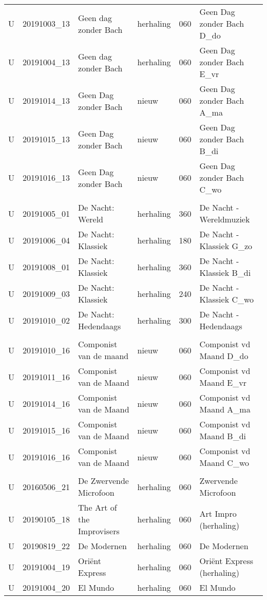 \documentclass[]{article}
\begin{document}
\begin{longtable}[l]{llllll}
U & 20191003\_13 & Geen dag zonder Bach & herhaling & 060 & Geen Dag zonder Bach D\_do\\
U & 20191004\_13 & Geen dag zonder Bach & herhaling & 060 & Geen Dag zonder Bach E\_vr\\
U & 20191014\_13 & Geen Dag zonder Bach & nieuw & 060 & Geen Dag zonder Bach A\_ma\\
U & 20191015\_13 & Geen Dag zonder Bach & nieuw & 060 & Geen Dag zonder Bach B\_di\\
\addlinespace
U & 20191016\_13 & Geen Dag zonder Bach & nieuw & 060 & Geen Dag zonder Bach C\_wo\\
 &  &  &  &  & \\
U & 20191005\_01 & De Nacht: Wereld & herhaling & 360 & De Nacht - Wereldmuziek\\
U & 20191006\_04 & De Nacht: Klassiek & herhaling & 180 & De Nacht - Klassiek G\_zo\\
U & 20191008\_01 & De Nacht: Klassiek & herhaling & 360 & De Nacht - Klassiek B\_di\\
\addlinespace
U & 20191009\_03 & De Nacht: Klassiek & herhaling & 240 & De Nacht - Klassiek C\_wo\\
U & 20191010\_02 & De Nacht: Hedendaags & herhaling & 300 & De Nacht - Hedendaags\\
 &  &  &  &  & \\
U & 20191010\_16 & Componist van de maand & nieuw & 060 & Componist vd Maand D\_do\\
U & 20191011\_16 & Componist van de Maand & nieuw & 060 & Componist vd Maand E\_vr\\
\addlinespace
U & 20191014\_16 & Componist van de Maand & nieuw & 060 & Componist vd Maand A\_ma\\
U & 20191015\_16 & Componist van de Maand & nieuw & 060 & Componist vd Maand B\_di\\
U & 20191016\_16 & Componist van de Maand & nieuw & 060 & Componist vd Maand C\_wo\\
 &  &  &  &  & \\
U & 20160506\_21 & De Zwervende Microfoon & herhaling & 060 & Zwervende Microfoon\\
\addlinespace
U & 20190105\_18 & The Art of the Improvisers & herhaling & 060 & Art Impro (herhaling)\\
U & 20190819\_22 & De Modernen & herhaling & 060 & De Modernen\\
U & 20191004\_19 & Oriënt Express & herhaling & 060 & Oriënt Express (herhaling)\\
U & 20191004\_20 & El Mundo & herhaling & 060 & El Mundo\\

\end{longtable}
\end{document}
